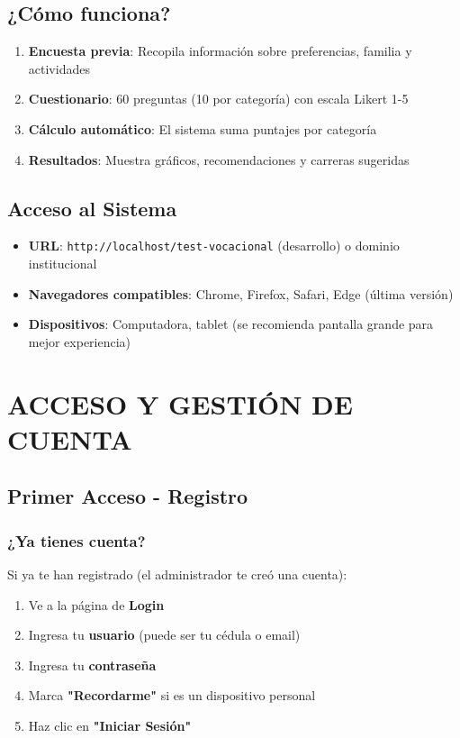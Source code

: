 \documentclass[12pt, a4paper]{report}
\begin{document}
\section{¿Cómo funciona?}
\begin{enumerate}
    \item \textbf{Encuesta previa}: Recopila información sobre preferencias, familia y actividades
    \item \textbf{Cuestionario}: 60 preguntas (10 por categoría) con escala Likert 1-5
    \item \textbf{Cálculo automático}: El sistema suma puntajes por categoría
    \item \textbf{Resultados}: Muestra gráficos, recomendaciones y carreras sugeridas
\end{enumerate}

\section{Acceso al Sistema}
\begin{itemize}
    \item \textbf{URL}: \texttt{http://localhost/test-vocacional} (desarrollo) o dominio institucional
    \item \textbf{Navegadores compatibles}: Chrome, Firefox, Safari, Edge (última versión)
    \item \textbf{Dispositivos}: Computadora, tablet (se recomienda pantalla grande para mejor experiencia)
\end{itemize}

\chapter{ACCESO Y GESTIÓN DE CUENTA}

\section{Primer Acceso - Registro}

\subsection{¿Ya tienes cuenta?}
Si ya te han registrado (el administrador te creó una cuenta):
\begin{enumerate}
    \item Ve a la página de \textbf{Login}
    \item Ingresa tu \textbf{usuario} (puede ser tu cédula o email)
    \item Ingresa tu \textbf{contraseña}
    \item Marca \textbf{"Recordarme"} si es un dispositivo personal
    \item Haz clic en \textbf{"Iniciar Sesión"}
\end{enumerate}
\end{document}
